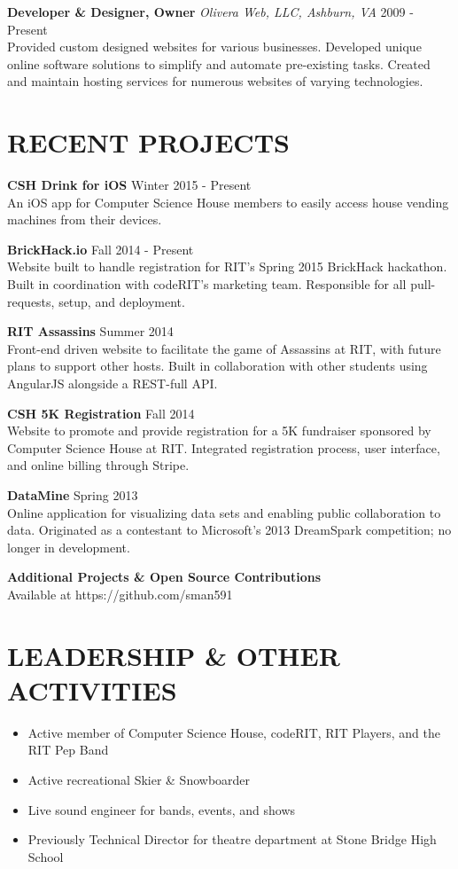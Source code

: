 \documentclass[line]{res}
\begin{document}
\begin{resume}
  \textbf{Developer \& Designer, Owner}
  \textit{Olivera Web, LLC, Ashburn, VA}
  \hfill
  2009 - Present\\
  Provided custom designed websites for various businesses.
  Developed unique online software solutions to simplify and automate pre-existing tasks.
  Created and maintain hosting services for numerous websites of varying technologies.

\section{RECENT PROJECTS}

  \textbf{CSH Drink for iOS}
  \hfill
  Winter 2015 - Present
  \\
  An iOS app for Computer Science House members to easily access house vending machines from their devices.

  \textbf{BrickHack.io}
  \hfill
  Fall 2014 - Present
  \\
  Website built to handle registration for RIT's Spring 2015 BrickHack hackathon. Built in coordination with codeRIT's marketing team. Responsible for all pull-requests, setup, and deployment.

  \textbf{RIT Assassins}
  \hfill
  Summer 2014
  \\
  Front-end driven website to facilitate the game of Assassins at RIT, with future plans to support other hosts. Built in collaboration with other students using AngularJS alongside a REST-full API.

  \textbf{CSH 5K Registration}
  \hfill
  Fall 2014
  \\
  Website to promote and provide registration for a 5K fundraiser sponsored by Computer Science House at RIT. Integrated registration process, user interface, and online billing through Stripe.

  \textbf{DataMine}
  \hfill
  Spring 2013
  \\
  Online application for visualizing data sets and enabling public collaboration to data.
  Originated as a contestant to Microsoft's 2013 DreamSpark competition; no longer in development.

  \textbf{Additional Projects \& Open Source Contributions}
  \hfill
  \\
  Available at https://github.com/sman591

\section{LEADERSHIP \& OTHER ACTIVITIES}
  \begin{itemize}[leftmargin=10pt]
  \item Active member of Computer Science House, codeRIT, RIT Players, and the RIT Pep Band
    \item Active recreational Skier \& Snowboarder
    \item Live sound engineer for bands, events, and shows
    \item Previously Technical Director for theatre department at Stone Bridge High School
  \end{itemize}

\end{resume}
\end{document}

